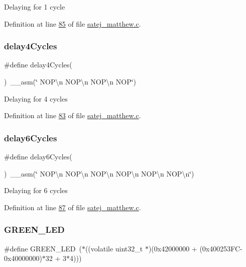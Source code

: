 Delaying for 1 cycle 

Definition at line \mbox{\hyperlink{satej__matthew_8c_source_l00085}{85}} of file \mbox{\hyperlink{satej__matthew_8c_source}{satej\+\_\+matthew.\+c}}.

\mbox{\label{satej__matthew_8c_a2ab1667016c16a6f0a44904c63a6f188}} 
\subsubsection{\texorpdfstring{delay4Cycles}{delay4Cycles}}
{\footnotesize\ttfamily \#define delay4\+Cycles(\begin{DoxyParamCaption}{ }\end{DoxyParamCaption})~\+\_\+\+\_\+asm(\char`\"{} N\+O\+P\textbackslash{}n N\+O\+P\textbackslash{}n N\+O\+P\textbackslash{}n N\+OP\char`\"{})}

Delaying for 4 cycles 

Definition at line \mbox{\hyperlink{satej__matthew_8c_source_l00083}{83}} of file \mbox{\hyperlink{satej__matthew_8c_source}{satej\+\_\+matthew.\+c}}.

\mbox{\label{satej__matthew_8c_aebf11bb4f185afba013bb3946fd88992}} 
\subsubsection{\texorpdfstring{delay6Cycles}{delay6Cycles}}
{\footnotesize\ttfamily \#define delay6\+Cycles(\begin{DoxyParamCaption}{ }\end{DoxyParamCaption})~\+\_\+\+\_\+asm(\char`\"{} N\+O\+P\textbackslash{}n N\+O\+P\textbackslash{}n N\+O\+P\textbackslash{}n N\+O\+P\textbackslash{}n N\+O\+P\textbackslash{}n N\+O\+P\textbackslash{}n\char`\"{})}

Delaying for 6 cycles 

Definition at line \mbox{\hyperlink{satej__matthew_8c_source_l00087}{87}} of file \mbox{\hyperlink{satej__matthew_8c_source}{satej\+\_\+matthew.\+c}}.

\mbox{\label{satej__matthew_8c_a01649d652fa50957c6ef3c32b1238038}} 
\subsubsection{\texorpdfstring{GREEN\_LED}{GREEN\_LED}}
{\footnotesize\ttfamily \#define G\+R\+E\+E\+N\+\_\+\+L\+ED~($\ast$((volatile uint32\+\_\+t $\ast$)(0x42000000 + (0x400253\+F\+C-\/0x40000000)$\ast$32 + 3$\ast$4)))}

